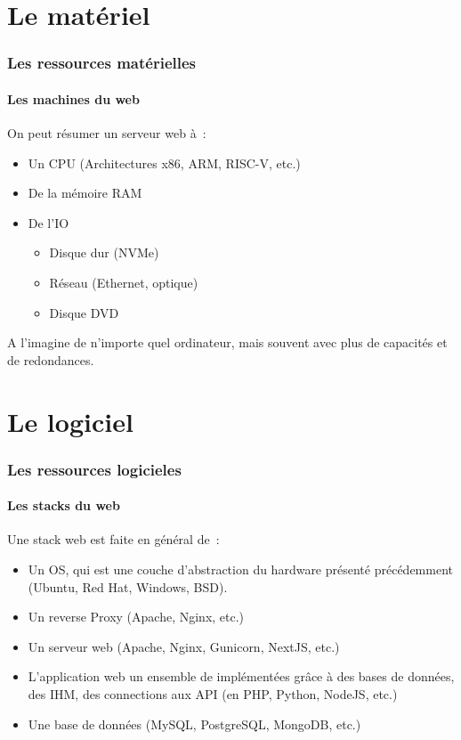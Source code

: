 \documentclass{beamer}
\begin{document}
    \section{Le matériel}\label{sec:le-materielle}

    \begin{frame}
        \transdissolve
        \frametitle{Les ressources matérielles}
        \framesubtitle{Les machines du web}
        On peut résumer un serveur web à~:
        \begin{itemize}
            \item Un CPU (Architectures x86, ARM, RISC-V, etc.)
            \item De la mémoire RAM
            \item De l'IO
            \begin{itemize}
                \item Disque dur (NVMe)
                \item Réseau (Ethernet, optique)
                \item Disque DVD
            \end{itemize}
        \end{itemize}
        A l'imagine de n'importe quel ordinateur, mais souvent avec plus de capacités et de redondances.
    \end{frame}


    \section{Le logiciel}\label{sec:le-logiciel}

    \begin{frame}
        \transdissolve
        \frametitle{Les ressources logicieles}
        \framesubtitle{Les stacks du web}
        Une stack web est faite en général de~:
        \begin{itemize}
            \item Un OS, qui est une couche d'abstraction du hardware présenté précédemment (Ubuntu, Red Hat, Windows, BSD).
            \item Un reverse Proxy (Apache, Nginx, etc.)
            \item Un serveur web (Apache, Nginx, Gunicorn, NextJS, etc.)
            \item L'application web un ensemble de  implémentées grâce à des bases de données, des IHM, des connections aux API (en PHP, Python, NodeJS, etc.)
            \item Une base de données (MySQL, PostgreSQL, MongoDB, etc.)
        \end{itemize}
    \end{frame}
\end{document}
